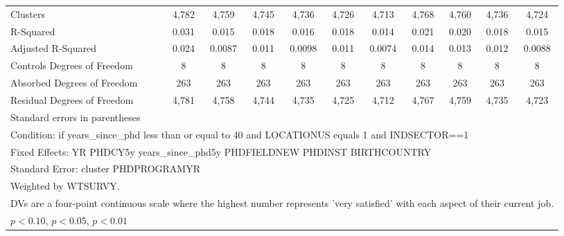 \begin{table}[htbp]
\begin{tabular}{l*{10}{c}}
Clusters&       4,782         &       4,759         &       4,745         &       4,736         &       4,726         &       4,713         &       4,768         &       4,760         &       4,736         &       4,724         \\
R-Squared&       0.031         &       0.015         &       0.018         &       0.016         &       0.018         &       0.014         &       0.021         &       0.020         &       0.018         &       0.015         \\
Adjusted R-Squared&       0.024         &      0.0087         &       0.011         &      0.0098         &       0.011         &      0.0074         &       0.014         &       0.013         &       0.012         &      0.0088         \\
Controls Degrees of Freedom&           8         &           8         &           8         &           8         &           8         &           8         &           8         &           8         &           8         &           8         \\
Absorbed Degrees of Freedom&         263         &         263         &         263         &         263         &         263         &         263         &         263         &         263         &         263         &         263         \\
Residual Degrees of Freedom&       4,781         &       4,758         &       4,744         &       4,735         &       4,725         &       4,712         &       4,767         &       4,759         &       4,735         &       4,723         \\
\hline\hline
\multicolumn{11}{l}{\footnotesize Standard errors in parentheses}\\
\multicolumn{11}{l}{\footnotesize Condition: if years\_since\_phd less than or equal to 40 and LOCATIONUS equals 1 and INDSECTOR==1}\\
\multicolumn{11}{l}{\footnotesize Fixed Effects: YR PHDCY5y years\_since\_phd5y PHDFIELDNEW PHDINST BIRTHCOUNTRY}\\
\multicolumn{11}{l}{\footnotesize Standard Error: cluster PHDPROGRAMYR}\\
\multicolumn{11}{l}{\footnotesize Weighted by WTSURVY.}\\
\multicolumn{11}{l}{\footnotesize DVs are a four-point continuous scale where the highest number represents 'very satisfied' with each aspect of their current job.}\\
\multicolumn{11}{l}{\footnotesize \sym{*} \(p<0.10\), \sym{**} \(p<0.05\), \sym{***} \(p<0.01\)}\\
\end{tabular}
\end{table}
